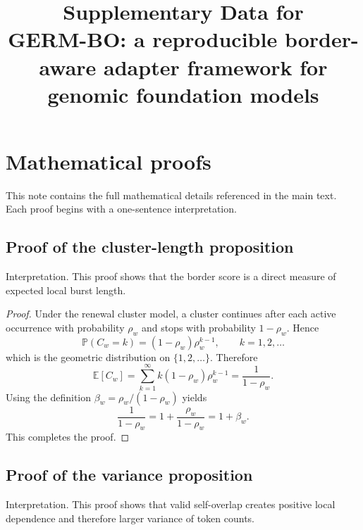 \documentclass[11pt,a4paper]{article}
\title{Supplementary Data for\\
\large GERM-BO: a reproducible border-aware adapter framework for genomic foundation models}
\author{}
\date{}
\begin{document}
\maketitle
\tableofcontents
\newpage

\section{Mathematical proofs}\label{app:proofs}
\label{note:s1}

This note contains the full mathematical details referenced in the main text. Each proof begins with a one-sentence interpretation.

\subsection{Proof of the cluster-length proposition}\label{app:proofcluster}

Interpretation. This proof shows that the border score is a direct measure of expected local burst length.

\begin{proof}
Under the renewal cluster model, a cluster continues after each active occurrence with probability $\rho_w$ and stops with probability $1-\rho_w$. Hence
\begin{equation}
\mathbb{P}(C_w = k) = (1-\rho_w)\rho_w^{k-1},
\qquad k = 1,2,\ldots
\label{eq:appgeom}
\end{equation}
which is the geometric distribution on $\{1,2,\ldots\}$. Therefore
\begin{equation}
\mathbb{E}[C_w]
=
\sum_{k=1}^{\infty} k (1-\rho_w)\rho_w^{k-1}
=
\frac{1}{1-\rho_w}.
\label{eq:appgeommean}
\end{equation}
Using the definition $\beta_w=\rho_w/(1-\rho_w)$ yields
\begin{equation}
\frac{1}{1-\rho_w} = 1 + \frac{\rho_w}{1-\rho_w} = 1+\beta_w.
\label{eq:appbetaidentity}
\end{equation}
This completes the proof.
\end{proof}

\subsection{Proof of the variance proposition}\label{app:proofvariance}

Interpretation. This proof shows that valid self-overlap creates positive local dependence and therefore larger variance of token counts.
\end{document}
